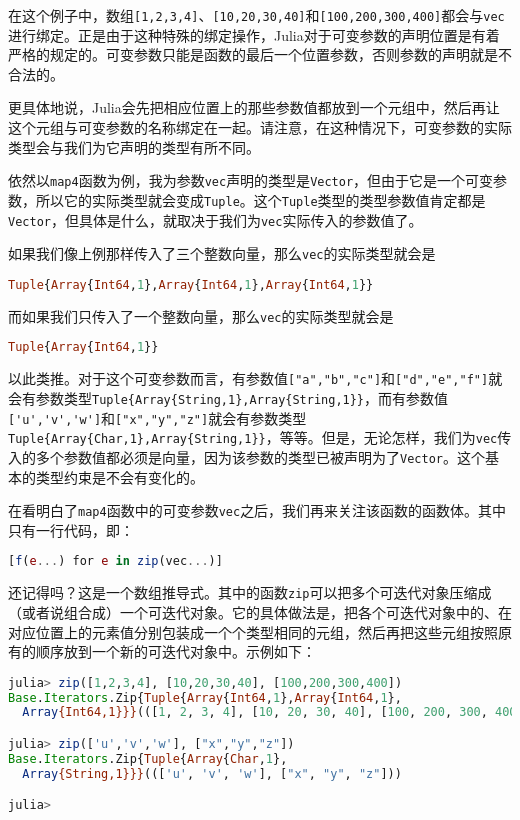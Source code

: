 在这个例子中，数组\verb|[1,2,3,4]|、\verb|[10,20,30,40]|和\verb|[100,200,300,400]|都会与\verb|vec|进行绑定。正是由于这种特殊的绑定操作，Julia对于可变参数的声明位置是有着严格的规定的。可变参数只能是函数的最后一个位置参数，否则参数的声明就是不合法的。

更具体地说，Julia会先把相应位置上的那些参数值都放到一个元组中，然后再让这个元组与可变参数的名称绑定在一起。请注意，在这种情况下，可变参数的实际类型会与我们为它声明的类型有所不同。

依然以\verb|map4|函数为例，我为参数\verb|vec|声明的类型是\verb|Vector|，但由于它是一个可变参数，所以它的实际类型就会变成\verb|Tuple|。这个\verb|Tuple|类型的类型参数值肯定都是\verb|Vector|，但具体是什么，就取决于我们为\verb|vec|实际传入的参数值了。

如果我们像上例那样传入了三个整数向量，那么\verb|vec|的实际类型就会是

\begin{lstlisting}[language=julia]
Tuple{Array{Int64,1},Array{Int64,1},Array{Int64,1}}
\end{lstlisting}

而如果我们只传入了一个整数向量，那么\verb|vec|的实际类型就会是

\begin{lstlisting}[language=julia]
Tuple{Array{Int64,1}}
\end{lstlisting}

以此类推。对于这个可变参数而言，有参数值\verb|["a","b","c"]|和\verb|["d","e","f"]|就会有参数类型\verb|Tuple{Array{String,1},Array{String,1}}|，而有参数值\verb|['u','v','w']|和\verb|["x","y","z"]|就会有参数类型\verb|Tuple{Array{Char,1},Array{String,1}}|，等等。但是，无论怎样，我们为\verb|vec|传入的多个参数值都必须是向量，因为该参数的类型已被声明为了\verb|Vector|。这个基本的类型约束是不会有变化的。

在看明白了\verb|map4|函数中的可变参数\verb|vec|之后，我们再来关注该函数的函数体。其中只有一行代码，即：

\begin{lstlisting}[language=julia]
[f(e...) for e in zip(vec...)]
\end{lstlisting}

还记得吗？这是一个数组推导式。其中的函数\verb|zip|可以把多个可迭代对象压缩成（或者说组合成）一个可迭代对象。它的具体做法是，把各个可迭代对象中的、在对应位置上的元素值分别包装成一个个类型相同的元组，然后再把这些元组按照原有的顺序放到一个新的可迭代对象中。示例如下：

\begin{lstlisting}[language=julia]
julia> zip([1,2,3,4], [10,20,30,40], [100,200,300,400])
Base.Iterators.Zip{Tuple{Array{Int64,1},Array{Int64,1},
  Array{Int64,1}}}(([1, 2, 3, 4], [10, 20, 30, 40], [100, 200, 300, 400]))

julia> zip(['u','v','w'], ["x","y","z"])
Base.Iterators.Zip{Tuple{Array{Char,1},
  Array{String,1}}}((['u', 'v', 'w'], ["x", "y", "z"]))

julia> 
\end{lstlisting}

